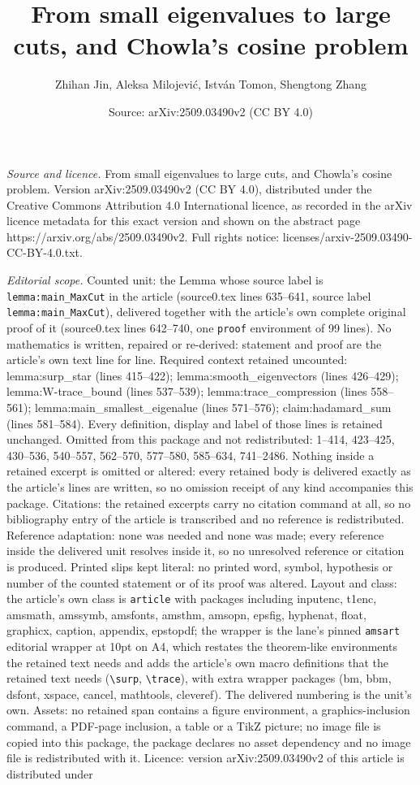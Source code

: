 \documentclass[10pt,a4paper]{amsart}
\title[From small eigenvalues to large cuts, and Chowla's cosine pr]{From small eigenvalues to large cuts, and Chowla's cosine problem}
\author{Zhihan Jin, Aleksa Milojevi\'c, Istv\'an Tomon, Shengtong Zhang}
\date{Source: arXiv:2509.03490v2 (CC BY 4.0)}
\begin{document}
\maketitle

\noindent\emph{Source and licence.} From small eigenvalues to large cuts, and Chowla's cosine problem. Version arXiv:2509.03490v2 (CC BY 4.0), distributed under the Creative Commons Attribution 4.0 International licence, as recorded in the arXiv licence metadata for this exact version and shown on the abstract page https://arxiv.org/abs/2509.03490v2. Full rights notice: licenses/arxiv-2509.03490-CC-BY-4.0.txt.\par\smallskip

\noindent\textit{Editorial scope.} Counted unit: the Lemma whose source label is \texttt{lemma:main\_MaxCut} in the article (source0.tex lines 635--641, source label \texttt{lemma:main\_MaxCut}), delivered together with the article's own complete original proof of it (source0.tex lines 642--740, one \texttt{proof} environment of 99 lines). No mathematics is written, repaired or re-derived: statement and proof are the article's own text line for line. Required context retained uncounted: lemma:surp\_star (lines 415--422); lemma:smooth\_eigenvectors (lines 426--429); lemma:W-trace\_bound (lines 537--539); lemma:trace\_compression (lines 558--561); lemma:main\_smallest\_eigenalue (lines 571--576); claim:hadamard\_sum (lines 581--584). Every definition, display and label of those lines is retained unchanged. Omitted from this package and not redistributed: 1--414, 423--425, 430--536, 540--557, 562--570, 577--580, 585--634, 741--2486. Nothing inside a retained excerpt is omitted or altered: every retained body is delivered exactly as the article's lines are written, so no omission receipt of any kind accompanies this package. Citations: the retained excerpts carry no citation command at all, so no bibliography entry of the article is transcribed and no reference is redistributed. Reference adaptation: none was needed and none was made; every reference inside the delivered unit resolves inside it, so no unresolved reference or citation is produced. Printed slips kept literal: no printed word, symbol, hypothesis or number of the counted statement or of its proof was altered. Layout and class: the article's own class is \texttt{article} with packages including inputenc, t1enc, amsmath, amssymb, amsfonts, amsthm, amsopn, epsfig, hyphenat, float, graphicx, caption, appendix, epstopdf; the wrapper is the lane's pinned \texttt{amsart} editorial wrapper at 10pt on A4, which restates the theorem-like environments the retained text needs and adds the article's own macro definitions that the retained text needs (\texttt{\textbackslash surp}, \texttt{\textbackslash trace}), with extra wrapper packages (bm, bbm, dsfont, xspace, cancel, mathtools, cleveref). The delivered numbering is the unit's own. Assets: no retained span contains a figure environment, a graphics-inclusion command, a PDF-page inclusion, a table or a TikZ picture; no image file is copied into this package, the package declares no asset dependency and no image file is redistributed with it. Licence: version arXiv:2509.03490v2 of this article is distributed under 
\end{document}
